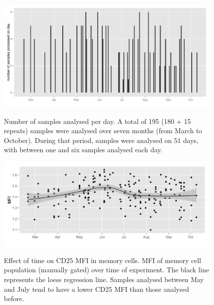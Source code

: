 \begin{figure}
\centering
\begin{minipage}{.65\textwidth}
\includegraphics[width=\linewidth]{figures/il2ra-samples-time}
\end{minipage}
{Number of samples analysed per day.}
{
A total of 195 (180 + 15 repeats) samples were analysed over seven months (from March to October).
During that period, samples were analysed on $51$ days,
with between one and six samples analysed each day.
}
\begin{minipage}{.65\textwidth}
\includegraphics[width=\linewidth]{figures/memory-CD25-MFI-time-effect}
\end{minipage}
{Effect of time on CD25 MFI in memory cells.}
{
 MFI of memory cell population (manually gated) over time of experiment.
The black line represents the loess regression line.
Samples analysed between May and July tend to have a lower CD25 MFI than those analysed before.
}
\end{figure}

